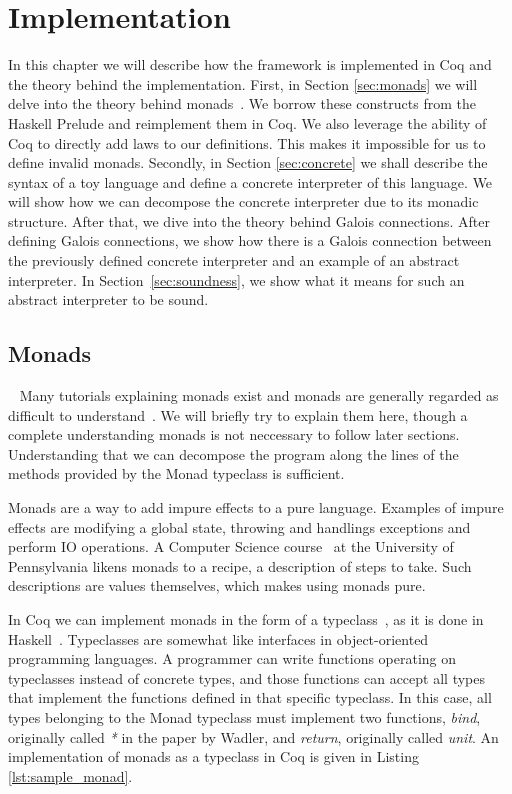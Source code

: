 \chapter{Implementation}
In this chapter we will describe how the framework is implemented in Coq and
the theory behind the implementation. First, in Section \ref{sec:monads} 
we will delve into the theory
behind monads~\cite{wadler1995monads}. We borrow these constructs from the 
Haskell Prelude and reimplement them in Coq. We also leverage the ability of
Coq to directly add laws to our definitions. This makes it impossible for us to
define invalid monads. Secondly, in Section \ref{sec:concrete} we shall describe the 
syntax of a toy language and define a concrete interpreter of this language. We
will show how we can decompose the concrete interpreter due to its monadic
structure. After that, we dive into the theory behind Galois connections. 
After defining Galois connections, we show how there is a Galois connection
between the previously defined concrete interpreter and an example of an
abstract interpreter.
In Section~\ref{sec:soundness}, we show what it means for such an abstract
interpreter to be sound. 

\section{Monads}~\label{sec:monads}
Many tutorials explaining monads exist and monads are generally regarded as
difficult to understand~\cite{petricek2018we}. We will briefly try to explain
them here, though a complete understanding monads is not neccessary to follow 
later sections. Understanding that we can decompose the program along the 
lines of the methods provided by the Monad typeclass is sufficient.

Monads are a way to add impure effects to a pure language. Examples of impure
effects are modifying a global state, throwing and handlings exceptions and
perform IO operations. A Computer Science course~\cite{upenn_monads} at the University of
Pennsylvania likens monads to a recipe, a description of steps to take. Such
descriptions are values themselves, which makes using monads pure.

In Coq we can implement monads in the form of a typeclass~\cite{sozeau2008first}, 
as it is done in Haskell~\cite{wadler1995monads}. Typeclasses are somewhat like interfaces in 
object-oriented programming languages. A programmer can write functions 
operating on typeclasses instead of concrete types, and those functions can
accept all types that implement the functions defined in that specific typeclass. 
In this case, all types belonging to the Monad typeclass must implement two functions,
\textit{bind}, originally called \textit{*} in the paper by Wadler, and 
\textit{return}, originally called \textit{unit}. An implementation of monads
as a typeclass in Coq is given in Listing \ref{lst:sample_monad}.

